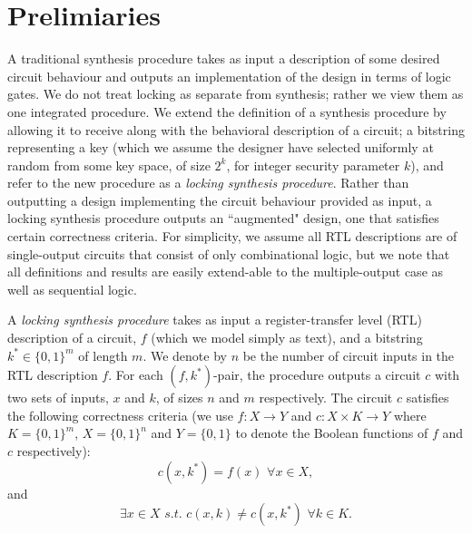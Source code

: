 \documentclass[conference,compsoc]{IEEEtran}
\newenvironment{definition}[1][Definition]{\begin{trivlist}
\item[\hskip \labelsep {\bfseries #1}]}{\end{trivlist}}
\begin{document}
\section{Prelimiaries}
A traditional synthesis procedure takes as input a description of some desired circuit behaviour and outputs an implementation of the design in terms of logic gates. We do not treat locking as separate from synthesis; rather we view them as one integrated procedure. We extend the definition of a synthesis procedure by allowing it to receive along with the behavioral description of a circuit; a bitstring representing a key (which we assume the designer have selected uniformly at random from some key space, of size $2^k$, for integer security parameter $k$), and refer to the new procedure as a \emph{locking synthesis procedure}. Rather than outputting a design implementing the circuit behaviour provided as input, a locking synthesis procedure outputs an ``augmented" design, one that satisfies certain correctness criteria. For simplicity, we assume all RTL descriptions are of single-output circuits that consist of only combinational logic, but we note that all definitions and results are easily extend-able to the multiple-output case as well as sequential logic.

\begin{definition}
A \emph{locking synthesis procedure} takes as input a register-transfer level (RTL) description of a circuit, $f$ (which we model simply as text), and a bitstring $k^{*} \in \{0,1\}^{m}$ of length $m$. We denote by $n$ be the number of circuit inputs in the RTL description $f$. For each $(f,k^*)$-pair, the procedure outputs a circuit $c$ with two sets of inputs, $x$ and $k$, of sizes $n$ and $m$ respectively. The circuit $c$  satisfies the following correctness criteria (we use $f: X \rightarrow Y$ and $c: X \times K \rightarrow Y$ where $K = \{0,1\}^{m}$, $X = \{0,1\}^{n}$ and $Y = \{0,1\}$ to denote the Boolean functions of $f$ and $c$ respectively):
$$ c(x,k^{*}) = f(x) \, \, \forall x \in X, $$
and 
$$ \exists  x \in X \,\, s.t. \,\, c(x,k) \neq c(x,k^{*}) \, \, \forall k \in K.$$ 
\end{definition}


\end{document}
